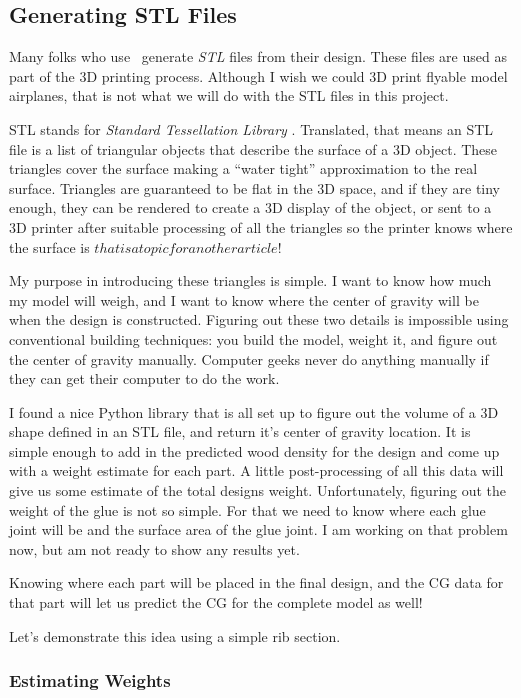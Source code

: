 \subsection{Generating STL Files}

Many folks who use \osc\ generate {\it STL} files from their design. These
files are used as part of the 3D printing process. Although I wish we could 3D
print flyable model airplanes, that is not what we will do with the STL files
in this project.

STL stands for {\it Standard Tessellation Library} \citep{stlwiki}. Translated,
that means an STL file is a list of triangular objects that describe the
surface of a 3D object. These triangles cover the surface making a ``water
tight'' approximation to the real surface. Triangles are guaranteed to be flat
in the 3D space, and if they are tiny enough, they can be rendered to create a
3D display of the object, or sent to a 3D printer after suitable processing of all
the triangles so the printer knows where the surface is \(that is a topic for
another article!\)

My purpose in introducing these triangles is simple. I want to know how much my
model will weigh, and I want to know where the center of gravity will be when
the design is constructed. Figuring out these two details is impossible using
conventional building techniques: you build the model, weight it, and figure
out the center of gravity manually. Computer geeks never do anything manually
if they can get their computer to do the work.

I found a nice Python library that is all set up to figure out the volume of a
3D shape defined in an STL file, and return it's center of gravity location. It
is simple enough to add in the predicted wood density for the design and come
up with a weight estimate for each part. A little post-processing of all this
data will give us some estimate of the total designs weight. Unfortunately,
figuring out the weight of the glue is not so simple. For that we need to know
where each glue joint will be and the surface area of the glue joint. I am
working on that problem now, but am not ready to show any results yet.

Knowing where each part will be placed in the final design, and the CG data for
that part will let us predict the CG for the complete model as well!

Let's demonstrate this idea using a simple rib section.

\subsubsection{Estimating Weights}

